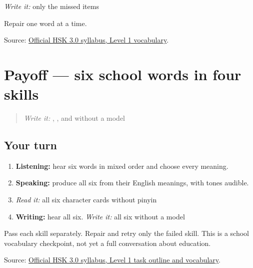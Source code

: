 \emph{Write it:} only the missed items

Repair one word at a time.

\begin{tcolorbox}[breakable,colback=teal!4,colframe=teal!35!black,title={Before you move on}]
Source: \href{https://hsk.cn-bj.ufileos.com/3.0/\%E6\%96\%B0\%E7\%89\%88HSK\%E8\%80\%83\%E8\%AF\%95\%E5\%A4\%A7\%E7\%BA\%B21219.pdf}{Official HSK 3.0 syllabus, Level 1 vocabulary}.
\end{tcolorbox}
\section[Practice]{Payoff — six school words in four skills}

\label{lesson:ZH-C13-practice}



\begin{quote}
\emph{Write it:} , , and  without a model
\end{quote}

\subsection*{Your turn}
\begin{enumerate}
\raggedright
  \item \textbf{Listening:} hear six words in mixed order and choose every meaning.
  \item \textbf{Speaking:} produce all six from their English meanings, with tones audible.
  \item \emph{Read it:} all six character cards without pinyin
  \item \textbf{Writing:} hear all six. \emph{Write it:} all six without a model
\end{enumerate}

Pass each skill separately. Repair and retry only the failed skill. This is a school vocabulary checkpoint, not yet a full conversation about education.

\begin{tcolorbox}[breakable,colback=teal!4,colframe=teal!35!black,title={Before you move on}]
Source: \href{https://hsk.cn-bj.ufileos.com/3.0/\%E6\%96\%B0\%E7\%89\%88HSK\%E8\%80\%83\%E8\%AF\%95\%E5\%A4\%A7\%E7\%BA\%B21219.pdf}{Official HSK 3.0 syllabus, Level 1 task outline and vocabulary}.
\end{tcolorbox}
